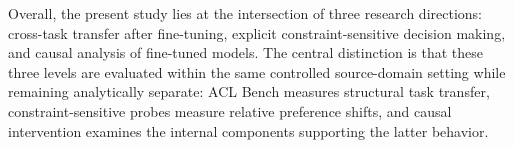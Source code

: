 \FloatBarrier

Overall, the present study lies at the intersection of three research directions: cross-task transfer after fine-tuning, explicit constraint-sensitive decision making, and causal analysis of fine-tuned models. The central distinction is that these three levels are evaluated within the same controlled source-domain setting while remaining analytically separate: ACL Bench measures structural task transfer, constraint-sensitive probes measure relative preference shifts, and causal intervention examines the internal components supporting the latter behavior.